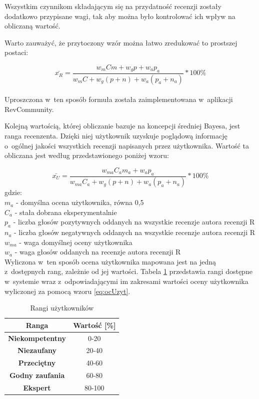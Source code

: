 Wszystkim czynnikom składającym się na przydatność recenzji zostały dodatkowo przypisane wagi, tak aby można było kontrolować ich wpływ na obliczaną wartość.

Warto zauważyć, że przytoczony wzór można łatwo zredukować to prostszej postaci:

\begin{equation}\label{eq:przydatnosc}
\bar{x_{R}}=\frac{w_{m}Cm+w_{g}{p}+w_{a}p_{a}}{w_{m}C+w_{g}(p+n)+w_{a}(p_{a}+n_{a})}*100\%
\end{equation}\\

Uproszczona w~ten sposób formuła została zaimplementowana w~aplikacji RevCommunity.

Kolejną wartością, której obliczanie bazuje na koncepcji średniej Bayesa, jest ranga recenzenta. Dzięki niej użytkownik uzyskuje poglądową informację o~ogólnej jakości wszystkich recenzji napisanych przez użytkownika. Wartość ta obliczana jest według przedstawionego poniżej wzoru:

\begin{equation}\label{eq:ocUzyt}
\bar{x_{U}}=\frac{w_{ma}C_{a}m_{a}+w_{a}p_{a}}{w_{ma}C_{a}+w_{g}(p+n)+w_{a}(p_{a}+n_{a})}*100\%
\end{equation}
gdzie:\\
$m_{a}$ - domyślna ocena użytkownika, równa 0,5\\
$C_{a}$ - stała dobrana eksperymentalnie\\
$p_{a}$ - liczba głosów pozytywnych oddanych na wszystkie recenzje autora recenzji R\\
$n_{a}$ - liczba głosów negatywnych oddanych na wszystkie recenzje autora recenzji R\\
$w_{ma}$ - waga domyślnej oceny użytkownika\\
$w_{a}$ - waga głosów oddanych na recenzje autora recenzji R\\

Wyliczona w~ten sposób ocena użytkownika mapowana jest na jedną z~dostępnych rang, zależnie od jej wartości. Tabela \ref{tab:rangi} przedstawia rangi dostępne w~systemie wraz z~odpowiadającymi im zakresami wartości oceny użytkownika wyliczonej za pomocą wzoru \ref{eq:ocUzyt}.

\begin{table}[H]
\centering
\begin{tabular}{|c||c|}  
\hline
\textbf{Ranga} & \textbf{Wartość [\%]} \\
\hline\hline
\textbf{Niekompetentny} & 0-20 \\  
\hline
\textbf{Niezaufany} & 20-40 \\  
\hline
\textbf{Przeciętny} & 40-60 \\  
\hline
\textbf{Godny zaufania} & 60-80 \\  
\hline
\textbf{Ekspert} & 80-100 \\  
\hline
\end{tabular}
\caption{Rangi użytkowników}\label{tab:rangi}
\end{table}


